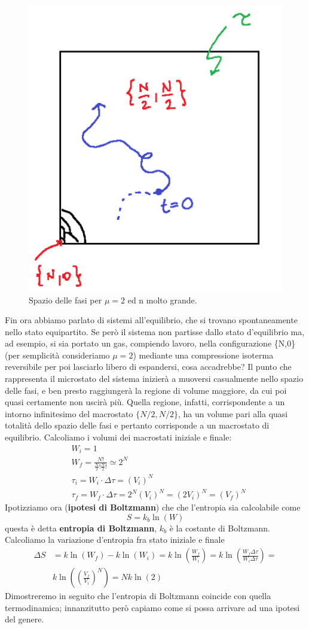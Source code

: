 \documentclass[
10pt, %
a4paper, %
oneside, %
headinclude,footinclude, %
BCOR5mm, %
]{scrartcl}
\begin{document}
\begin{figure}[h!]
	\centering
	\includegraphics[width=0.4\linewidth]{"../images/Spazio delle fasi"}
	\caption{Spazio delle fasi per $\mu = 2$ ed n molto grande.}
	\label{fig:spazio-delle-fasi}
\end{figure}
\FloatBarrier
Fin ora abbiamo parlato di sistemi all'equilibrio, che si trovano spontaneamente nello stato equipartito. Se però il sistema non partisse dallo stato d'equilibrio ma, ad esempio, si sia portato un gas, compiendo lavoro, nella configurazione \{N,0\} (per semplicità consideriamo $\mu=2$) mediante una compressione isoterma reversibile per poi lasciarlo libero di espandersi, cosa accadrebbe? Il punto che rappresenta il microstato del sistema inizierà a muoversi casualmente nello spazio delle fasi, e ben presto raggiungerà la regione di volume maggiore, da cui poi quasi certamente non uscirà più. Quella regione, infatti, corrispondente a un intorno infinitesimo del macrostato \(\{N/2, N/2\}\), ha un volume pari alla quasi totalità dello spazio delle fasi e pertanto corrisponde a un macrostato di equilibrio. Calcoliamo i volumi dei macrostati iniziale e finale:
\begin{align*}
	&W_i = 1\\
	&W_f = \frac{N!}{\frac{N}{2}!\frac{N}{2}!}\simeq2^N\\
	&\tau_i = W_i\cdot\Delta\tau = (V_i)^N \\
	&\tau_f = W_f\cdot\Delta\tau = 2^N(V_i)^N=(2 V_i)^N = (V_f)^N
\end{align*}
Ipotizziamo ora (\textbf{ipotesi di Boltzmann}) che che l'entropia sia calcolabile come
\[S=k_b\ln(W)\]
questa è detta \textbf{entropia di Boltzmann}, \(k_b\) è la costante di Boltzmann.\\
Calcoliamo la variazione d'entropia fra stato iniziale e finale
\begin{align*}
	\Delta S &= k\ln(W_{f})-k\ln(W_{i})=k\ln\left(\frac{W_f}{W_i}\right)=k\ln\left(\frac{W_f\Delta\tau}{W_i\Delta\tau}\right)=\\
	 &k\ln\left(\left(\frac{V_f}{V_i}\right)^N\right)=Nk\ln(2)
\end{align*}
Dimostreremo in seguito che l'entropia di Boltzmann coincide con quella termodinamica; innanzitutto però capiamo come si possa arrivare ad una ipotesi del genere.\\
\end{document}
